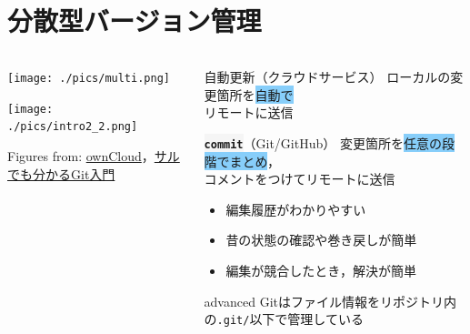 \documentclass[12pt,dvipdfmx,svgnames,uplatex,aspectratio=169]{beamer}
\newcommand{\git}[1]{{\colorbox{WhiteSmoke}{\texttt{\textbf{#1}}}}}  %
\newcommand{\stress}[1]{{\colorbox{LightSkyBlue}{#1}}}  %
\begin{document}
\section{分散型バージョン管理}
\begin{frame}{\insertsection}
  \begin{columns}[c] %
    \begin{column}{0.5\textwidth}
      \texttt{[image: ./pics/multi.png]}

      \texttt{[image: ./pics/intro2\_2.png]}

      \scriptsize{Figures from: \href{https://owncloud.jp}{ownCloud}，\href{https://backlog.com/ja/git-tutorial/}{サルでも分かるGit入門}}
    \end{column}
    \begin{column}{0.5\textwidth}
      \begin{block}{自動更新（クラウドサービス）}
        ローカルの変更箇所を\stress{自動で}\\リモートに送信
      \end{block}
      \hspace{\baselineskip}
      \begin{block}{\git{commit}（Git/GitHub）}
        変更箇所を\stress{任意の段階でまとめ}，\\コメントをつけてリモートに送信
        \begin{itemize}
          \item 編集履歴がわかりやすい
          \item 昔の状態の確認や巻き戻しが簡単
          \item 編集が競合したとき，解決が簡単
        \end{itemize}
        \begin{beamercolorbox}[rounded=true]{advanced}
          \footnotesize{
            Gitはファイル情報をリポジトリ内の\texttt{.git/}以下で管理している
            }
        \end{beamercolorbox}
      \end{block}
    \end{column}
  \end{columns}
\end{frame}
\end{document}
